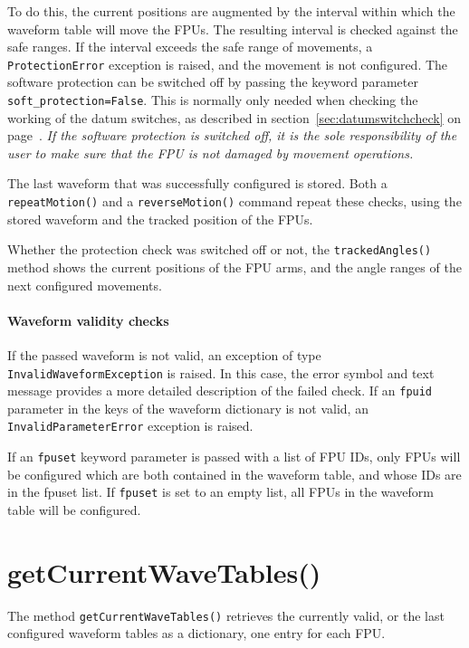 \documentclass[fontsize=12,a4paper]{scrreprt}
\begin{document}
To do this, the current positions are augmented by the interval within
which the waveform table will move the FPUs. The resulting interval is
checked against the safe ranges. If the interval exceeds the safe
range of movements, a \texttt{ProtectionError} exception is raised,
and the movement is not configured.  The software protection can be
switched off by passing the keyword parameter
\texttt{soft\_protection=False}. This is normally only needed when
checking the working of the datum switches, as described in
section~\ref{sec:datumswitchcheck} on
page~\pageref{sec:datumswitchcheck}. \emph{If the software protection
  is switched off, it is the sole responsibility of the user to make
  sure that the FPU is not damaged by movement operations.}

The last waveform that was successfully configured is stored. Both a
\texttt{repeatMotion()} and a \texttt{reverseMotion()} command repeat
these checks, using the stored waveform and the tracked position of
the FPUs.


Whether the protection check was switched off or not, the
\texttt{trackedAngles()} method shows the current positions of the FPU
arms, and the angle ranges of the next configured movements.




\paragraph{Waveform validity checks}
\begin{sloppypar}
If the passed waveform is not valid, an exception of type
\texttt{InvalidWaveformException} is raised. In this case, the error
symbol and text message provides a more detailed description of the
failed check. If an \texttt{fpuid} parameter in the keys of the waveform dictionary
is not valid, an \texttt{InvalidParameterError} exception is raised.
\end{sloppypar}

If an \texttt{fpuset} keyword parameter is passed with a list of FPU
IDs, only FPUs will be configured which are both contained in the
waveform table, and whose IDs are in the fpuset list. If
\texttt{fpuset} is set to an empty list, all FPUs in the waveform
table will be configured.


\section{getCurrentWaveTables()}
 The method
\texttt{getCurrentWaveTables()} retrieves the currently valid, or the
last configured waveform tables as a dictionary, one entry for each
FPU.
\end{document}
